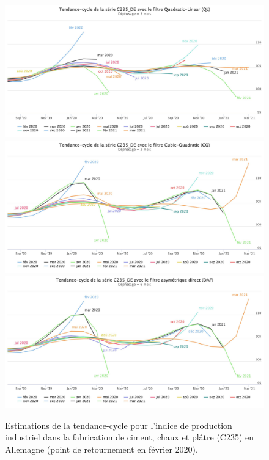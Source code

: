 \documentclass[
  11pt,
  french,
  a4paper]{article}
\newcommand\1{\mathds{1}}
\begin{document}
\begin{figure}[H]

{\centering \includegraphics[width=0.9\linewidth,]{img/simulations/c235_de_ql} \includegraphics[width=0.9\linewidth,]{img/simulations/c235_de_cq} \includegraphics[width=0.9\linewidth,]{img/simulations/c235_de_daf} 

}

\caption[Estimations de la tendance-cycle pour l'indice de production industriel dans la fabrication de ciment, chaux et plâtre (C235) en Allemagne (point de retournement en février 2020)]{Estimations de la tendance-cycle pour l'indice de production industriel dans la fabrication de ciment, chaux et plâtre (C235) en Allemagne (point de retournement en février 2020).}\label{fig:c235dep2}

\footnotesize
\normalsize\end{figure}
\end{document}
